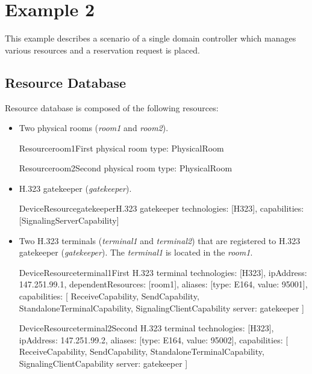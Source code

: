 \section{Example 2}

This example describes a scenario of a single domain controller which manages various resources and a reservation request is placed.

\subsection{Resource Database}

Resource database is composed of the following resources:
\begin{itemize}
\item Two physical rooms (\emph{room1} and \emph{room2}).

\begin{EntityExample}{Resource}{room1}{First physical room}
type: PhysicalRoom
\end{EntityExample}

\begin{EntityExample}{Resource}{room2}{Second physical room}
type: PhysicalRoom
\end{EntityExample}

\item H.323 gatekeeper (\emph{gatekeeper}).

\begin{EntityExample}{DeviceResource}{gatekeeper}{H.323 gatekeeper}
technologies: [H323], 
capabilities: [SignalingServerCapability]
\end{EntityExample}

\item Two H.323 terminals (\emph{terminal1} and \emph{terminal2}) that are
  registered to H.323 gatekeeper (\emph{gatekeeper}). The \emph{terminal1} is
  located in the \emph{room1}.
  
\begin{EntityExample}{DeviceResource}{terminal1}{First H.323 terminal}
technologies: [H323], 
ipAddress: 147.251.99.1,
dependentResources: [room1],
aliases: [{type: E164, value: 95001}],
capabilities: [
  ReceiveCapability, SendCapability,
  StandaloneTerminalCapability,
  SignalingClientCapability {server: gatekeeper}
]
\end{EntityExample}

\begin{EntityExample}{DeviceResource}{terminal2}{Second H.323 terminal}
technologies: [H323], 
ipAddress: 147.251.99.2,
aliases: [{type: E164, value: 95002}],
capabilities: [
  ReceiveCapability, SendCapability,
  StandaloneTerminalCapability,
  SignalingClientCapability {server: gatekeeper}
]
\end{EntityExample}


\end{itemize}
